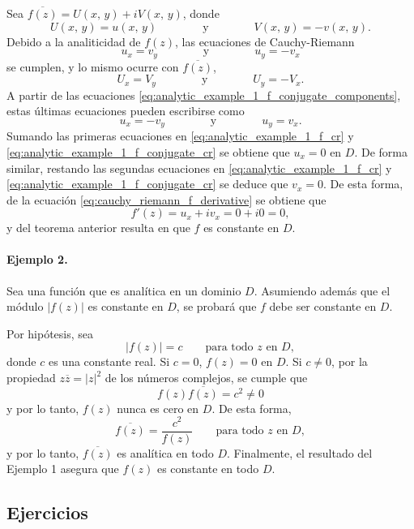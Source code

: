 \documentclass[a4paper]{report}
\begin{document}
Sea \(\overline{f(z)}=U(x,\,y)+iV(x,\,y)\), donde
\begin{equation}\label{eq:analytic_example_1_f_conjugate_components}
 U(x,\,y)=u(x,\,y)
 \qquad\qquad\textrm{y}\qquad\qquad
 V(x,\,y)=-v(x,\,y). 
\end{equation}
Debido a la analiticidad de \(f(z)\), las ecuaciones de Cauchy-Riemann 
\begin{equation}\label{eq:analytic_example_1_f_cr}
 u_x=v_y
 \qquad\qquad\textrm{y}\qquad\qquad
 u_y=-v_x
\end{equation}
se cumplen, y lo mismo ocurre con \(\overline{f(z)}\),
\[
 U_x=V_y
 \qquad\qquad\textrm{y}\qquad\qquad
 U_y=-V_x.
\]
A partir de las ecuaciones \ref{eq:analytic_example_1_f_conjugate_components}, estas últimas ecuaciones pueden escribirse como
\begin{equation}\label{eq:analytic_example_1_f_conjugate_cr}
 u_x=-v_y
 \qquad\qquad\textrm{y}\qquad\qquad
 u_y=v_x .
\end{equation}
Sumando las primeras ecuaciones en \ref{eq:analytic_example_1_f_cr} y \ref{eq:analytic_example_1_f_conjugate_cr} se obtiene que \(u_x=0\) en \(D\). De forma similar, restando las segundas ecuaciones en \ref{eq:analytic_example_1_f_cr} y \ref{eq:analytic_example_1_f_conjugate_cr} se deduce que \(v_x=0\). De esta forma, de la ecuación \ref{eq:cauchy_riemann_f_derivative} se obtiene que 
\[
 f'(z)=u_x+iv_x=0+i0=0,
\]
y del teorema anterior resulta en que \(f\) es constante en \(D\).

\paragraph{Ejemplo 2.} Sea una función que es analítica en un dominio \(D\). Asumiendo además que el módulo \(|f(z)|\) es constante en \(D\), se probará que \(f\) debe ser constante en \(D\).

Por hipótesis, sea
\[
 |f(z)|=c\qquad\textrm{para todo }z\textrm{ en }D,
\]
donde \(c\) es una constante real. Si \(c=0\), \(f(z)=0\) en \(D\). Si \(c\neq0\), por la propiedad \(z\overline{z}=|z|^2\) de los números complejos, se cumple que 
\[
 f(z)\overline{f(z)}=c^2\neq0
\]
y por lo tanto, \(f(z)\) nunca es cero en \(D\). De esta forma,
\[
 \overline{f(z)}=\frac{c^2}{f(z)}\qquad\textrm{para todo }z\textrm{ en }D,
\]
y por lo tanto, \(\overline{f(z)}\) es analítica en todo \(D\). Finalmente, el resultado del Ejemplo 1 asegura que \(f(z)\) es constante en todo \(D\).

\subsection*{Ejercicios}
\end{document}
